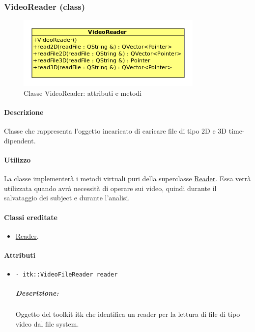 \subsubsection{VideoReader (class)}
\label{spevideoreader}
\begin{figure}[!h]
\centering
			\includegraphics[scale=1]{./Content/Immagini/model/VideoReader.png}
			\caption{Classe VideoReader: attributi e metodi}
			\label{cl_videoreader}
\end{figure}
\paragraph{Descrizione \\}
Classe che rappresenta l'oggetto incaricato di caricare file di tipo 2D e 3D time-dipendent.
\paragraph{Utilizzo\\}
La classe implementerà i metodi virtuali puri della superclasse \hyperref[spereader]{Reader}. Essa verrà utilizzata quando \project{} avrà necessità di operare sui video, quindi durante il salvataggio dei subject\g{} e durante l'analisi.
\paragraph{Classi ereditate\\}
	\begin{itemize}
		\item \hyperref[spereader]{Reader}.
	\end{itemize}
\paragraph{\color{black}Attributi \\}
	\begin{itemize}
		\item \color{teal}\verb!- itk::VideoFileReader reader!
		\color{black}
		\subparagraph{Descrizione:} Oggetto del toolkit itk che identifica un reader per la lettura di file di tipo video dal file system.
	\end{itemize}

